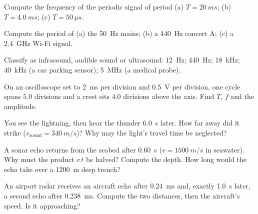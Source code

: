 \begin{exercise}[$\star$]\label{exo:g10:signals-and-waves:1}
Compute the frequency of the periodic signal of period
(a) $T = \qty{20}{ms}$; (b) $T = \qty{4.0}{ms}$;
(c) $T = \qty{50}{\micro s}$.
\end{exercise}

\begin{exercise}[$\star$]\label{exo:g10:signals-and-waves:2}
Compute the period of (a) the \qty{50}{Hz} mains; (b) a \qty{440}{Hz}
concert A; (c) a \qty{2.4}{GHz} Wi-Fi signal.
\end{exercise}

\begin{exercise}[$\star$]\label{exo:g10:signals-and-waves:3}
Classify as infrasound, audible sound or ultrasound: \qty{12}{Hz};
\qty{440}{Hz}; \qty{18}{kHz}; \qty{40}{kHz} (a car parking sensor);
\qty{5}{MHz} (a medical probe).
\end{exercise}

\begin{exercise}[$\star$]\label{exo:g10:signals-and-waves:4}
On an oscilloscope set to \qty{2}{ms} per division and \qty{0.5}{V} per
division, one cycle spans $5.0$ divisions and a crest sits $4.0$
divisions above the axis. Find $T$, $f$ and the amplitude.
\end{exercise}

\begin{exercise}[$\star$]\label{exo:g10:signals-and-waves:5}
You see the lightning, then hear the thunder \qty{6.0}{s} later. How far
away did it strike ($v_{\text{sound}} = \qty{340}{m/s}$)? Why may the
light's travel time be neglected?
\end{exercise}

\begin{exercise}[$\star\star$]\label{exo:g10:signals-and-waves:6}
A sonar echo returns from the seabed after \qty{0.60}{s}
($v = \qty{1500}{m/s}$ in seawater). Why must the product $v\,t$ be
halved? Compute the depth. How long would the echo take over a
\qty{1200}{m} deep trench?
\end{exercise}

\begin{exercise}[$\star\star$]\label{exo:g10:signals-and-waves:7}
An airport radar receives an aircraft echo after \qty{0.24}{ms} and,
exactly \qty{1.0}{s} later, a second echo after \qty{0.238}{ms}. Compute
the two distances, then the aircraft's speed. Is it approaching?
\end{exercise}

